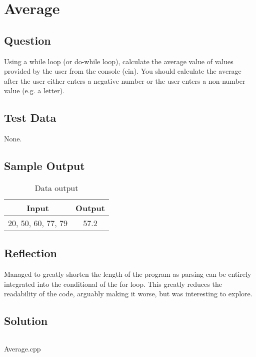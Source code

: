 \section{Average}
    \subsection*{Question}
    Using a while loop (or do-while loop), calculate the average value of values provided by the user from the console (cin).
    You should calculate the average after the user either enters a negative number or the user enters a non-number value (e.g. a letter).
            
    \subsection*{Test Data}
        None.
        
    \subsection*{Sample Output}
        \begin{table}[H]
            \centering
            \begin{tabular}{c c}
                \hline
                \textbf{Input} & \textbf{Output} \\
                \hline
                20, 50, 60, 77, 79 & 57.2 \\
                \hline
            \end{tabular}
            \caption{Data output}
        \end{table}

    \subsection*{Reflection}
        Managed to greatly shorten the length of the program as parsing can
        be entirely integrated into the conditional of the for loop.
        This greatly reduces the readability of the code, arguably making it worse,
        but was interesting to explore.
        
    \subsection*{Solution}
        \begin{listing}[H]
            \inputminted{cpp}{../Tasks/06-Average/Average.cpp}%
            \caption{Average.cpp}
        \end{listing}